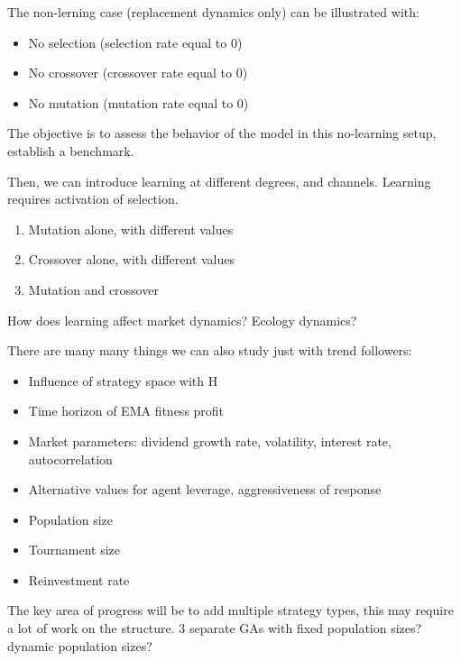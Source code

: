 \documentclass{article}
\begin{document}
The non-lerning case (replacement dynamics only) can be illustrated with:
\begin{itemize}
    \item No selection (selection rate equal to 0)
    \item No crossover (crossover rate equal to 0)
    \item No mutation (mutation rate equal to 0)
\end{itemize}
The objective is to assess the behavior of the model in this no-learning setup, establish a benchmark.

Then, we can introduce learning at different degrees, and channels. Learning requires activation of selection.

\begin{enumerate}
    \item Mutation alone, with different values
    \item Crossover alone, with different values
    \item Mutation and crossover
\end{enumerate}

How does learning affect market dynamics? Ecology dynamics?

There are many many things we can also study just with trend followers:
\begin{itemize}
    \item Influence of strategy space with H
    \item Time horizon of EMA fitness profit
    \item Market parameters: dividend growth rate, volatility, interest rate, autocorrelation
    \item Alternative values for agent leverage, aggressiveness of response 
    \item Population size
    \item Tournament size
    \item Reinvestment rate
\end{itemize}

The key area of progress will be to add multiple strategy types, this may require a lot of work on the structure. 3 separate GAs with fixed population sizes? dynamic population sizes?

\printbibliography
\end{document}
